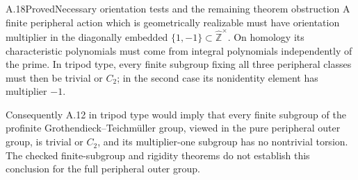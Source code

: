 \begin{statement}{A.18}{Proved}{Necessary orientation tests and the remaining theorem obstruction}
A finite peripheral action which is geometrically realizable
must have orientation multiplier in the diagonally embedded
$\{1,-1\}\subset\widehat{\mathbb Z}^{\times}$. On homology
its characteristic polynomials must come from integral
polynomials independently of the prime. In tripod type,
every finite subgroup fixing all three peripheral classes
must then be trivial or $C_2$; in the second case its
nonidentity element has multiplier $-1$.

Consequently A.12 in tripod type would imply that every
finite subgroup of the profinite Grothendieck--Teichm\"uller
group, viewed in the pure peripheral outer group, is trivial
or $C_2$, and its multiplier-one subgroup has no nontrivial
torsion. The checked finite-subgroup and rigidity theorems
do not establish this conclusion for the full peripheral
outer group.
\end{statement}
